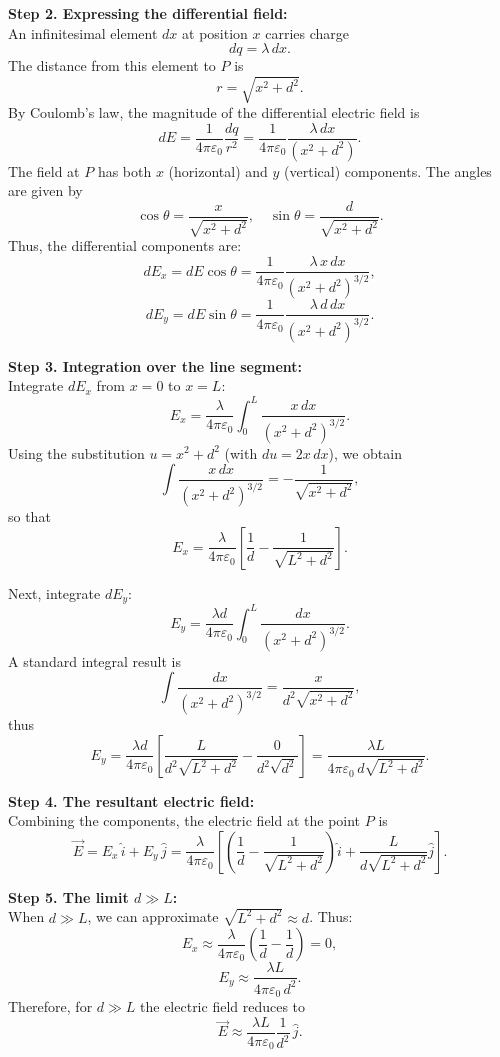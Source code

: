 \documentclass{article}
\begin{document}
\bigskip
\textbf{Step 2. Expressing the differential field:} \\
An infinitesimal element \(dx\) at position \(x\) carries charge 
\[
dq = \lambda\,dx.
\]
The distance from this element to \(P\) is 
\[
r = \sqrt{x^2 + d^2}.
\]
By Coulomb’s law, the magnitude of the differential electric field is
\[
dE = \frac{1}{4\pi\varepsilon_0}\frac{dq}{r^2} = \frac{1}{4\pi\varepsilon_0}\frac{\lambda\,dx}{(x^2+d^2)}.
\]
The field at \(P\) has both \(x\) (horizontal) and \(y\) (vertical) components. The angles are given by
\[
\cos\theta = \frac{x}{\sqrt{x^2+d^2}},\quad \sin\theta = \frac{d}{\sqrt{x^2+d^2}}.
\]
Thus, the differential components are:
\[
dE_x = dE\cos\theta = \frac{1}{4\pi\varepsilon_0}\frac{\lambda\,x\,dx}{(x^2+d^2)^{3/2}},
\]
\[
dE_y = dE\sin\theta = \frac{1}{4\pi\varepsilon_0}\frac{\lambda\,d\,dx}{(x^2+d^2)^{3/2}}.
\]

\bigskip
\textbf{Step 3. Integration over the line segment:} \\
Integrate \(dE_x\) from \(x=0\) to \(x=L\):
\[
E_x = \frac{\lambda}{4\pi\varepsilon_0}\int_0^L \frac{x\,dx}{(x^2+d^2)^{3/2}}.
\]
Using the substitution \(u=x^2+d^2\) (with \(du=2x\,dx\)), we obtain
\[
\int \frac{x\,dx}{(x^2+d^2)^{3/2}} = -\frac{1}{\sqrt{x^2+d^2}},
\]
so that
\[
E_x = \frac{\lambda}{4\pi\varepsilon_0}\left[\frac{1}{d}-\frac{1}{\sqrt{L^2+d^2}}\right].
\]

Next, integrate \(dE_y\):
\[
E_y = \frac{\lambda d}{4\pi\varepsilon_0}\int_0^L \frac{dx}{(x^2+d^2)^{3/2}}.
\]
A standard integral result is
\[
\int \frac{dx}{(x^2+d^2)^{3/2}} = \frac{x}{d^2\sqrt{x^2+d^2}},
\]
thus
\[
E_y = \frac{\lambda d}{4\pi\varepsilon_0}\left[\frac{L}{d^2\sqrt{L^2+d^2}}-\frac{0}{d^2\sqrt{d^2}}\right] = \frac{\lambda L}{4\pi\varepsilon_0\,d\sqrt{L^2+d^2}}.
\]

\bigskip
\textbf{Step 4. The resultant electric field:} \\
Combining the components, the electric field at the point \(P\) is
\[
\vec{E} = E_x\,\hat{i} + E_y\,\hat{j} = \frac{\lambda}{4\pi\varepsilon_0}\left[\left(\frac{1}{d}-\frac{1}{\sqrt{L^2+d^2}}\right)\hat{i} + \frac{L}{d\sqrt{L^2+d^2}}\hat{j}\right].
\]

\bigskip
\textbf{Step 5. The limit \(d \gg L\):} \\
When \(d \gg L\), we can approximate \(\sqrt{L^2+d^2} \approx d\). Thus:
\[
E_x \approx \frac{\lambda}{4\pi\varepsilon_0}\left(\frac{1}{d}-\frac{1}{d}\right)= 0,
\]
\[
E_y \approx \frac{\lambda L}{4\pi\varepsilon_0\,d^2}.
\]
Therefore, for \(d \gg L\) the electric field reduces to
\[
\vec{E} \approx \frac{\lambda L}{4\pi\varepsilon_0}\frac{1}{d^2}\,\hat{j}.
\]
\end{document}
